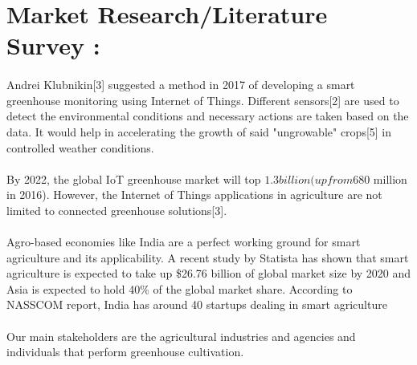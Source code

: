 \documentclass[12pt]{extarticle}
\begin{document}
\section{Market Research/Literature Survey : }
\paragraph{}
Andrei Klubnikin[3] suggested a method in 2017 of developing a smart greenhouse monitoring using Internet of Things. Different sensors[2] are used to detect the environmental conditions and necessary actions are taken based on the data. It would help in accelerating the growth of said "ungrowable" crops[5] in controlled weather conditions.
\paragraph{}
By 2022, the global IoT greenhouse market will top $1.3 billion (up from $680 million in 2016). However, the Internet of Things applications in agriculture are not limited to connected greenhouse solutions[3]. 
\paragraph{}
Agro-based economies like India are a perfect working ground for smart agriculture and its applicability. A recent study by Statista has shown that smart agriculture is expected to take up \$26.76 billion of global market size by 2020 and Asia is expected to hold 40\% of the global market share. According to NASSCOM report, India has around 40 startups dealing in smart agriculture
\paragraph{}
Our main stakeholders are the agricultural industries and agencies and individuals that perform greenhouse cultivation.
\end{document}
